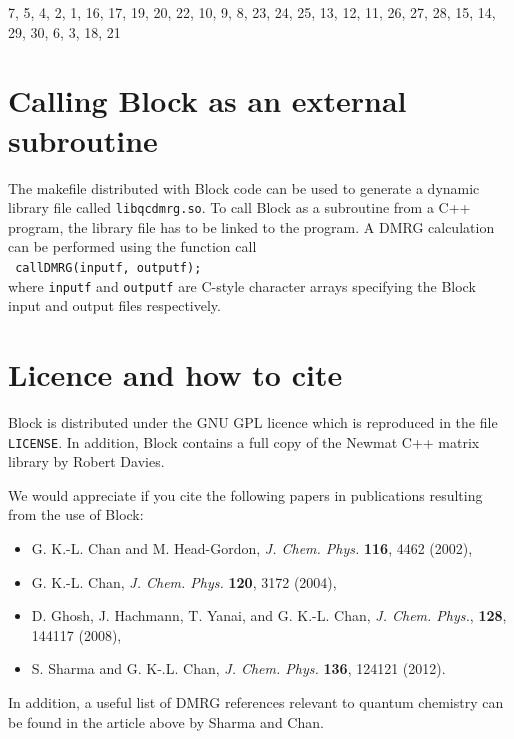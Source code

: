 \documentclass[letterpaper,12pt,aps, pra]{revtex4-1}
\begin{document}
 7,  5,  4,  2,  1,
16, 17, 19, 20, 22,
10,  9,  8, 23, 24,
25, 13, 12, 11, 26,
27, 28, 15, 14, 29,
30,  6,  3, 18, 21            

\section{Calling Block as an external subroutine}
The makefile distributed with Block code can be used to generate a dynamic library file called \texttt{libqcdmrg.so}. To call Block as a subroutine from a C++ program, the library file has to be linked to the program. A DMRG calculation can be performed using the function call\\
\texttt{
callDMRG(inputf, outputf);\\
} 
where \texttt{inputf} and \texttt{outputf} are C-style character arrays specifying the Block input and output files respectively.

\section{Licence and how to cite}\label{sec:papers}

Block is distributed under the GNU GPL licence which is reproduced in the file \texttt{LICENSE}. In addition, Block contains a 
full copy of the Newmat C++ matrix library by Robert Davies.

We would appreciate if you cite the following papers in publications resulting from the use of Block:
\begin{itemize}
 \item G. K.-L. Chan and M. Head-Gordon, \emph{J. Chem. Phys.} \textbf{116}, 4462 (2002),
 \item G. K.-L. Chan, \emph{J. Chem. Phys.} \textbf{120}, 3172 (2004),
 \item D. Ghosh, J. Hachmann, T. Yanai, and G. K.-L. Chan, \emph{J. Chem. Phys.}, {\bf 128}, 144117 (2008),
 \item S. Sharma and G. K-.L. Chan, \emph{J. Chem. Phys.} \textbf{136}, 124121 (2012).
\end{itemize}

In addition, a useful list of DMRG references relevant to quantum chemistry
can be found in the article above by Sharma and Chan.
\end{document}
